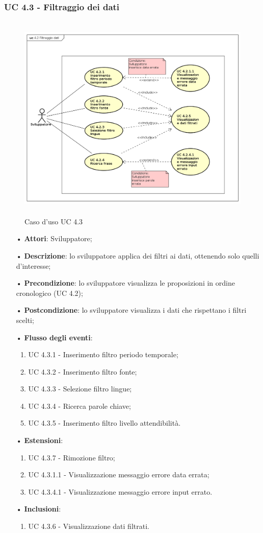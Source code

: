 \subsubsection{UC 4.3 - Filtraggio dei dati}
\begin{figure}[H]
	\centering
	\includegraphics[width=17cm, height=10cm]{img/UC420.png} 
	\caption{Caso d'uso UC 4.3}\label{fig:430}
\end{figure}
\begin{itemize}
	\item[•]\textbf{Attori}: Sviluppatore;
	\item[•]\textbf{Descrizione}: lo sviluppatore applica dei filtri ai dati, ottenendo solo quelli d'interesse;
	\item[•]\textbf{Precondizione}: lo sviluppatore visualizza le proposizioni in ordine cronologico (UC 4.2);
	\item[•]\textbf{Postcondizione}: lo sviluppatore visualizza i dati che rispettano i filtri scelti;
	\item[•]\textbf{Flusso degli eventi}:
	\begin{enumerate}
		\item UC 4.3.1 - Inserimento filtro periodo temporale;
		\item UC 4.3.2 - Inserimento filtro {fonte};
		\item UC 4.3.3 - Selezione filtro lingue;
		\item UC 4.3.4 - Ricerca parole chiave;
		\item UC 4.3.5 - Inserimento filtro livello attendibilità.
	\end{enumerate}
	\item[•]\textbf{Estensioni}:
	\begin{enumerate}
		\item UC 4.3.7 - Rimozione filtro;
		\item UC 4.3.1.1 - Visualizzazione messaggio errore data errata;
		\item UC 4.3.4.1 - Visualizzazione messaggio errore input errato.
	\end{enumerate}
	\item[•]\textbf{Inclusioni}:
	\begin{enumerate}
		\item UC 4.3.6 - Visualizzazione dati filtrati.
	\end{enumerate}
\end{itemize}
